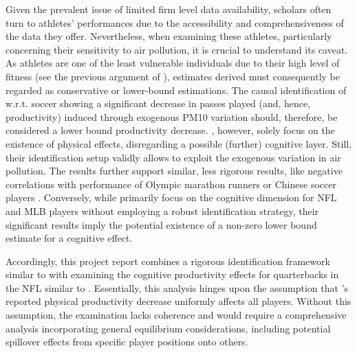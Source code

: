 \documentclass[12pt,a4paper]{article}
\begin{document}
Given the prevalent issue of limited firm level data availability, scholars often turn to athletes' performances due to the accessibility and comprehensiveness of the data they offer. Nevertheless, when examining these athletes, particularly concerning their sensitivity to air pollution, it is crucial to understand its caveat. As athletes are one of the least vulnerable individuals due to their high level of fitness (see the previous argument of \citealp{peled2011}), estimates derived must consequently be regarded as conservative or lower-bound estimations. The causal identification of \citet{lichter2017} w.r.t. soccer showing a significant decrease in passes played (and, hence, productivity) induced through exogenous PM10 variation should, therefore, be considered a lower bound productivity decrease. \citet{lichter2017}, however, solely focus on the existence of physical effects, disregarding a possible (further) cognitive layer. Still, their identification setup validly allows to exploit the exogenous variation in air pollution. The results further support similar, less rigorous results, like negative correlations with performance of Olympic marathon runners \citep{marr2010} or Chinese soccer players \citep{qin2022}. Conversely, while \citet{heintz2022} primarily focus on the cognitive dimension for NFL and MLB players without employing a robust identification strategy, their significant results imply the potential existence of a non-zero lower bound estimate for a cognitive effect. 

Accordingly, this project report combines a rigorous identification framework similar to \citet{lichter2017} with examining the cognitive productivity effects for quarterbacks in the NFL similar to \citet{heintz2022}. Essentially, this analysis hinges upon the assumption that \citeauthor{lichter2017}'s reported physical productivity decrease uniformly affects all players. Without this assumption, the examination lacks coherence and would require a comprehensive analysis incorporating general equilibrium considerations, including potential spillover effects from specific player positions onto others.
\end{document}
